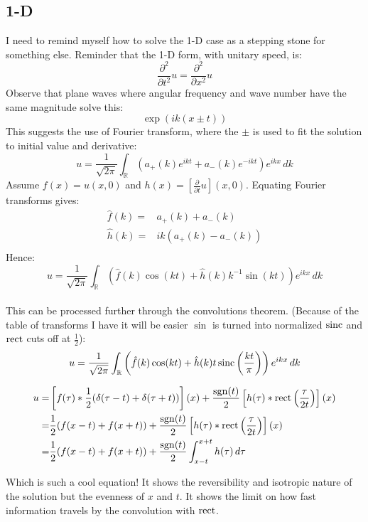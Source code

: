 \subsection{1-D}
I need to remind myself how to solve the 1-D case as a stepping stone for something else.
Reminder that the 1-D form, with unitary speed, is:
\[ \frac{\partial^2}{\partial t^2} u = \frac{\partial^2}{\partial x^2}u\]
Observe that plane waves where angular frequency and wave number have the same magnitude solve this:
\[ \exp(ik(x\pm t))\]
This suggests the use of Fourier transform, where the $\pm$ is used to fit the solution to initial value and derivative:
\[ u = \frac{1}{\sqrt{2\pi}}\int_\mathbb{R}(a_+(k)e^{ikt}+a_-(k)e^{-ikt})e^{ikx}\,dk\]
Assume $f(x) = u(x,0)$ and $h(x) = \left[\frac{\partial}{\partial t}u\right](x,0)$.
Equating Fourier transforms gives:
\begin{equation*}
\begin{aligned}
	\hat{f}(k) =& a_+(k)+a_-(k) \\
	\hat{h}(k) =& ik(a_+(k)-a_-(k)) \\
\end{aligned}
\end{equation*}
Hence:
\[ u = \frac{1}{\sqrt{2\pi}}\int_\mathbb{R}(\hat{f}(k)\cos(kt)+\hat{h}(k)k^{-1}\sin(kt))e^{ikx}\,dk\]
\\

This can be processed further through the convolutions theorem.
(Because of the table of transforms I have it will be easier $\sin$ is turned into normalized $\operatorname{sinc}$ and $\operatorname{rect}$ cuts off at $\frac{1}{2}$):
\[ u = \frac{1}{\sqrt{2\pi}}\int_\mathbb{R}\left(\hat{f}(k)\cos(kt)+\hat{h}(k)t\operatorname{sinc}\left(\frac{kt}{\pi}\right)\right)e^{ikx}\,dk\]

\begin{equation*}
\begin{aligned}
	u =& \left[f(\tau)\ast\frac{1}{2}(\delta(\tau-t)+\delta(\tau+t))\right](x) + \frac{\operatorname{sgn}(t)}{2}\left[h(\tau)\ast\operatorname{rect}\left(\frac{\tau}{2t}\right)\right](x)\\
	 =&  \frac{1}{2}(f(x-t)+f(x+t)) + \frac{\operatorname{sgn}(t)}{2}\left[h(\tau)\ast\operatorname{rect}\left(\frac{\tau}{2t}\right)\right](x)\\
	 =&  \frac{1}{2}(f(x-t)+f(x+t)) + \frac{\operatorname{sgn}(t)}{2}\int_{x-t}^{x+t}h(\tau)\,d\tau\\
\end{aligned}
\end{equation*}

Which is such a cool equation!
It shows the reversibility and isotropic nature of the solution but the evenness of $x$ and $t$.
It shows the limit on how fast information travels by the convolution with $\operatorname{rect}$.

